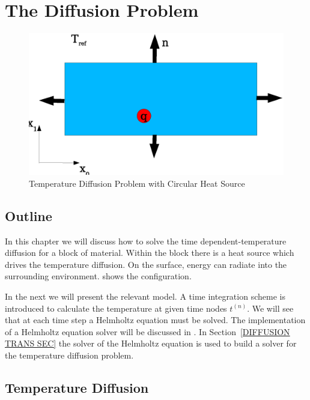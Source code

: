 \section{The Diffusion Problem}
\label{DIFFUSION CHAP}

\begin{figure}
\centerline{\includegraphics[width=\figwidth]{DiffusionDomain}}
\caption{Temperature Diffusion Problem with Circular Heat Source}
\label{DIFFUSION FIG 1}
\end{figure}

\subsection{\label{DIFFUSION OUT SEC}Outline}
In this chapter we will discuss how to solve the time dependent-temperature diffusion for
a block of material. Within the block there is a heat source which drives the temperature diffusion.
On the surface, energy can radiate into the surrounding environment.
 shows the configuration.

In the next  we will present the relevant model. A 
time integration scheme is introduced to calculate the temperature at given time nodes $t^{(n)}$. 
We will see that at each time step a Helmholtz equation  
must be solved. 
The implementation of a Helmholtz equation solver will be discussed in . 
In Section~\ref{DIFFUSION TRANS SEC} the solver of the Helmholtz equation is used to build a
solver for the temperature diffusion problem. 

\subsection{\label{DIFFUSION TEMP SEC}Temperature Diffusion}

